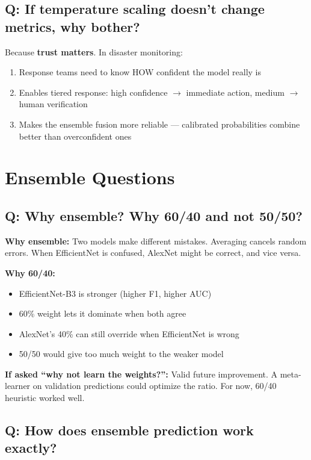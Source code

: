 \documentclass[11pt]{article}
\begin{document}
\subsection{Q: If temperature scaling doesn't change metrics, why bother?}

Because \textbf{trust matters}. In disaster monitoring:
\begin{enumerate}[noitemsep]
    \item Response teams need to know HOW confident the model really is
    \item Enables tiered response: high confidence $\to$ immediate action, medium $\to$ human verification
    \item Makes the ensemble fusion more reliable --- calibrated probabilities combine better than overconfident ones
\end{enumerate}

\section{Ensemble Questions}

\subsection{Q: Why ensemble? Why 60/40 and not 50/50?}

\textbf{Why ensemble:} Two models make different mistakes. Averaging cancels random errors. When EfficientNet is confused, AlexNet might be correct, and vice versa.

\textbf{Why 60/40:}
\begin{itemize}[noitemsep]
    \item EfficientNet-B3 is stronger (higher F1, higher AUC)
    \item 60\% weight lets it dominate when both agree
    \item AlexNet's 40\% can still override when EfficientNet is wrong
    \item 50/50 would give too much weight to the weaker model
\end{itemize}

\textbf{If asked ``why not learn the weights?'':} Valid future improvement. A meta-learner on validation predictions could optimize the ratio. For now, 60/40 heuristic worked well.

\subsection{Q: How does ensemble prediction work exactly?}
\end{document}
